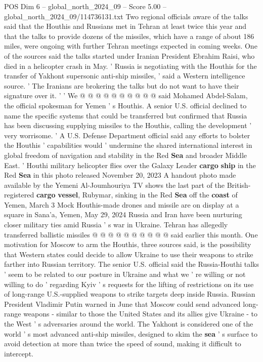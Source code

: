 \begin{textsample}{POS Dim 6 – global\_north\_2024\_09 – Score 5.00 – global\_north\_2024\_09/114736131.txt}
Two regional officials aware of the talks said that the Houthis and Russians met in Tehran at least twice this year and that the talks to provide dozens of the missiles, which have a range of about 186 miles, were ongoing with further Tehran meetings expected in coming weeks.
One of the sources said the talks started under Iranian President Ebrahim Raisi, who died in a helicopter crash in May. ' Russia is negotiating with the Houthis for the transfer of Yakhont supersonic anti-ship missiles, ' said a Western intelligence source. ' The Iranians are brokering the talks but do not want to have their signature over it. ' ' We @ @ @ @ @ @ @ @ @ @ said Mohamed Abdel-Salam, the official spokesman for Yemen ' s Houthis.
A senior U.S. official declined to name the specific systems that could be transferred but confirmed that Russia has been discussing supplying missiles to the Houthis, calling the development ' very worrisome. ' A U.S.
Defense Department official said any efforts to bolster the Houthis ' capabilities would ' undermine the shared international interest in global freedom of navigation and stability in the Red \textbf{Sea} and broader Middle East. ' Houthi military helicopter flies over the Galaxy Leader \textbf{cargo} \textbf{ship} in the Red \textbf{Sea} in this photo released November 20, 2023 A handout photo made available by the Yemeni Al-Joumhouriya TV shows the last part of the British-registered \textbf{cargo} \textbf{vessel}, Rubymar, sinking in the Red \textbf{Sea} off the \textbf{coast} of Yemen, March 3 Mock Houthis-made drones and missile are on display at a square in Sana'a, Yemen, May 29, 2024 Russia and Iran have been nurturing closer military ties amid Russia ' s war in Ukraine.
Tehran has allegedly transferred ballistic missiles @ @ @ @ @ @ @ @ @ @ said earlier this month.
One motivation for Moscow to arm the Houthis, three sources said, is the possibility that Western states could decide to allow Ukraine to use their weapons to strike farther into Russian territory.
The senior U.S. official said the Russia-Houthi talks ' seem to be related to our posture in Ukraine and what we ' re willing or not willing to do ' regarding Kyiv ' s requests for the lifting of restrictions on its use of long-range U.S.-supplied weapons to strike targets deep inside Russia.
Russian President Vladimir Putin warned in June that Moscow could send advanced long-range weapons - similar to those the United States and its allies give Ukraine - to the West ' s adversaries around the world.
The Yakhont is considered one of the world ' s most advanced anti-ship missiles, designed to skim the \textbf{sea} ' s surface to avoid detection at more than twice the speed of sound, making it difficult to intercept.

\end{textsample}
